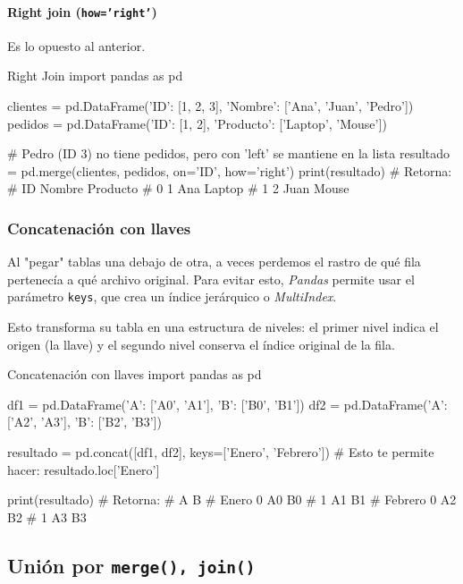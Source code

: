 \paragraph{Right join (\texttt{how='right'})}

Es lo opuesto al anterior.

\begin{pycode}{Right Join}
import pandas as pd

clientes = pd.DataFrame({'ID': [1, 2, 3], 'Nombre': ['Ana', 'Juan', 'Pedro']})
pedidos = pd.DataFrame({'ID': [1, 2], 'Producto': ['Laptop', 'Mouse']})

# Pedro (ID 3) no tiene pedidos, pero con 'left' se mantiene en la lista
resultado = pd.merge(clientes, pedidos, on='ID', how='right')
print(resultado) # Retorna:
#    ID Nombre Producto
# 0   1    Ana   Laptop
# 1   2   Juan    Mouse
\end{pycode}


\subsubsection{Concatenación con llaves}

Al "pegar" tablas una debajo de otra, a veces perdemos el rastro de qué fila pertenecía a qué archivo original. Para evitar esto, \textit{Pandas} permite usar el parámetro \texttt{keys}, que crea un índice jerárquico o \textit{MultiIndex}.

Esto transforma su tabla en una estructura de niveles: el primer nivel indica el origen (la llave) y el segundo nivel conserva el índice original de la fila.
\begin{pycode}{Concatenación con llaves}
import pandas as pd

df1 = pd.DataFrame({'A': ['A0', 'A1'], 'B': ['B0', 'B1']})
df2 = pd.DataFrame({'A': ['A2', 'A3'], 'B': ['B2', 'B3']})

resultado = pd.concat([df1, df2], keys=['Enero', 'Febrero'])
# Esto te permite hacer: resultado.loc['Enero']

print(resultado) # Retorna:
#             A   B
# Enero   0  A0  B0
#         1  A1  B1
# Febrero 0  A2  B2
#         1  A3  B3
\end{pycode}





\subsection{Unión por \texttt{merge(), join()}}

